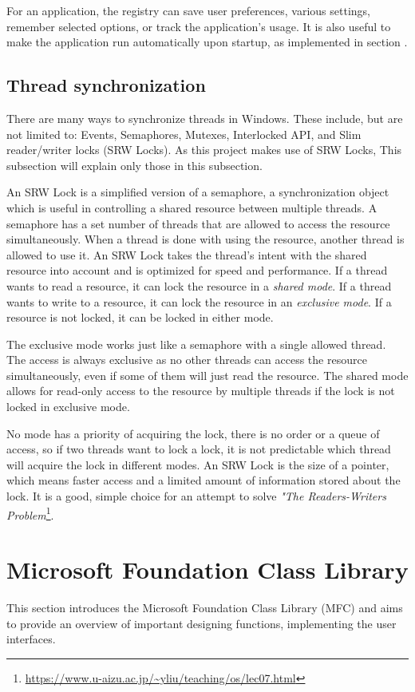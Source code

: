 For an application, the registry can save user preferences, various settings, remember selected options, or track the application's usage. It is also useful to make the application run automatically upon startup, as implemented in section .

\subsection*{Thread synchronization}
There are many ways to synchronize threads in Windows. These include, but are not limited to: Events, Semaphores, Mutexes, Interlocked API, and Slim reader/writer locks (SRW Locks). As this project makes use of SRW Locks, This subsection will explain only those in this subsection.\cite{WinSyncFuncs}

An SRW Lock is a simplified version of a semaphore, a synchronization object which is useful in controlling a shared resource between multiple threads. A semaphore has a set number of threads that are allowed to access the resource simultaneously. When a thread is done with using the resource, another thread is allowed to use it.\cite{WinSemaphores} An SRW Lock takes the thread's intent with the shared resource into account and is optimized for speed and performance. If a thread wants to read a resource, it can lock the resource in a \textit{shared mode}. If a thread wants to write to a resource, it can lock the resource in an \textit{exclusive mode}. If a resource is not locked, it can be locked in either mode. 

The exclusive mode works just like a semaphore with a single allowed thread. The access is always exclusive as no other threads can access the resource simultaneously, even if some of them will just read the resource.
The shared mode allows for read-only access to the resource by multiple threads if the lock is not locked in exclusive mode.

No mode has a priority of acquiring the lock, there is no order or a queue of access, so if two threads want to lock a lock, it is not predictable which thread will acquire the lock in different modes. An SRW Lock is the size of a pointer, which means faster access and a limited amount of information stored about the lock. It is a good, simple choice for an attempt to solve \textit{"The Readers-Writers Problem}\footnote{\url{https://www.u-aizu.ac.jp/~yliu/teaching/os/lec07.html}}.
\cite{WinSRW}

\section{Microsoft Foundation Class Library}
This section introduces the Microsoft Foundation Class Library (MFC) and aims to provide an overview of important designing functions, implementing the user interfaces.

